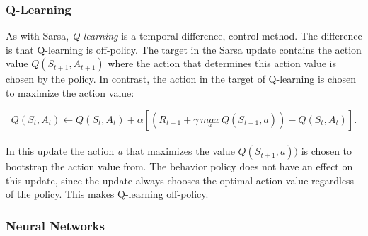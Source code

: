 \subsubsection*{Q-Learning}

As with Sarsa, \textit{Q-learning} is a temporal difference, control method. The difference is that Q-learning is off-policy.  The target in the Sarsa update contains the action value $Q(S_{t+1}, A_{t+1})$ where the action that determines this action value is chosen by the policy. In contrast, the action in the target of Q-learning is chosen to maximize the action value:

\begin{equation}    \label{eq: Q-Learning update}
    Q(S_t, A_t) \leftarrow Q(S_t, A_t) + \alpha [(R_{t+1} + \gamma \, \underset{a}{max} \, Q(S_{t+1}, a))  - Q(S_t, A_t) ].
\end{equation}
\\[-2mm] \noindent
In this update the action \textit{a} that maximizes the value $Q(S_{t+1}, a)) $ is chosen to bootstrap the action value from. The behavior policy does not have an effect on this update, since the update always chooses the optimal action value regardless of the policy. This makes Q-learning off-policy.


















\subsubsection{Neural Networks}

